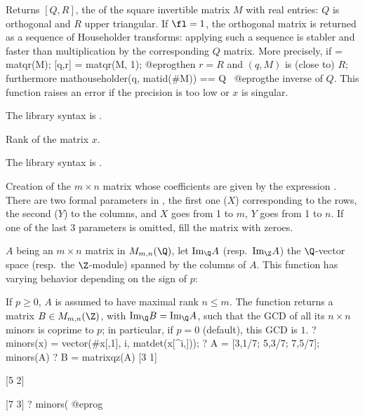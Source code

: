 \label{se:matqr}
Returns $[Q,R]$, the  of the square invertible
matrix $M$ with real entries: $Q$ is orthogonal and $R$ upper triangular. If
$\fl=1$, the orthogonal matrix is returned as a sequence of Householder
transforms: applying such a sequence is stabler and faster than
multiplication by the corresponding $Q$ matrix.
More precisely, if
\bprog
  [Q,R] = matqr(M);
  [q,r] = matqr(M, 1);
@eprog\noindent then $r = R$ and $(q, M)$ is
(close to) $R$; furthermore
\bprog
  mathouseholder(q, matid(#M)) == Q~
@eprog\noindent the inverse of $Q$. This function raises an error if the
precision is too low or $x$ is singular.

The library syntax is .

\label{se:matrank}
Rank of the matrix $x$.

The library syntax is .

\label{se:matrix}
Creation of the
$m\times n$ matrix whose coefficients are given by the expression
. There are two formal parameters in , the first one
($X$) corresponding to the rows, the second ($Y$) to the columns, and $X$
goes from 1 to $m$, $Y$ goes from 1 to $n$. If one of the last 3 parameters
is omitted, fill the matrix with zeroes.

\label{se:matrixqz}
$A$ being an $m\times n$ matrix in $M_{m,n}(\Q)$, let
$\text{Im}_\Q A$ (resp.~$\text{Im}_\Z A$) the $\Q$-vector space
(resp.~the $\Z$-module) spanned by the columns of $A$. This function has
varying behavior depending on the sign of $p$:

If $p \geq 0$, $A$ is assumed to have maximal rank $n\leq m$. The function
returns a matrix $B\in M_{m,n}(\Z)$, with $\text{Im}_\Q B = \text{Im}_\Q A$,
such that the GCD of all its $n\times n$ minors is coprime to
$p$; in particular, if $p = 0$ (default), this GCD is $1$.
\bprog
? minors(x) = vector(#x[,1], i, matdet(x[^i,]));
? A = [3,1/7; 5,3/7; 7,5/7]; minors(A)
? B = matrixqz(A)
[3 1]

[5 2]

[7 3]
? minors(%
@eprog

